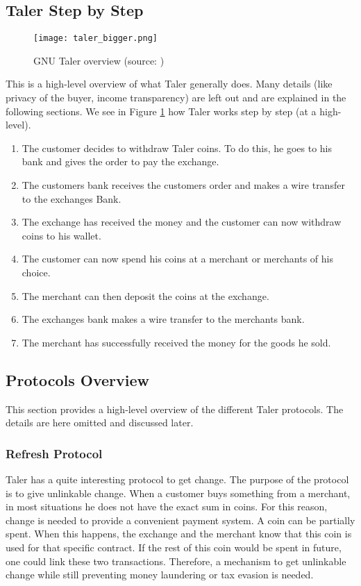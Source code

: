 \subsection{Taler Step by Step}
\begin{figure}[htp]
    \texttt{[image: taler\_bigger.png]}
    \centering
    \caption{GNU Taler overview (source: \cite{pic:taler-overview})}
    \label{fig:taler-overview-big}
\end{figure}
This is a high-level overview of what Taler generally does.
Many details (like privacy of the buyer, income transparency) are left out and are explained in the following sections.
We see in Figure \ref{fig:taler-overview-big} how Taler works step by step (at a high-level).
\begin{enumerate}
    \item The customer decides to withdraw Taler coins. To do this, he goes to his bank and gives the order to pay the exchange.
    \item The customers bank receives the customers order and makes a wire transfer to the exchanges Bank.
    \item The exchange has received the money and the customer can now withdraw coins to his wallet.
    \item The customer can now spend his coins at a merchant or merchants of his choice.
    \item The merchant can then deposit the coins at the exchange.
    \item The exchanges bank makes a wire transfer to the merchants bank.
    \item The merchant has successfully received the money for the goods he sold.
\end{enumerate}

\subsection{Protocols Overview}
This section provides a high-level overview of the different Taler protocols.
The details are here omitted and discussed later.

\subsubsection{Refresh Protocol}
Taler has a quite interesting protocol to get change.
The purpose of the protocol is to give unlinkable change.
When a customer buys something from a merchant, in most situations he does not have the exact sum in coins.
For this reason, change is needed to provide a convenient payment system.
A coin can be partially spent.
When this happens, the exchange and the merchant know that this coin is used for that specific contract.
If the rest of this coin would be spent in future, one could link these two transactions.
Therefore, a mechanism to get unlinkable change while still preventing money laundering or tax evasion is needed.

